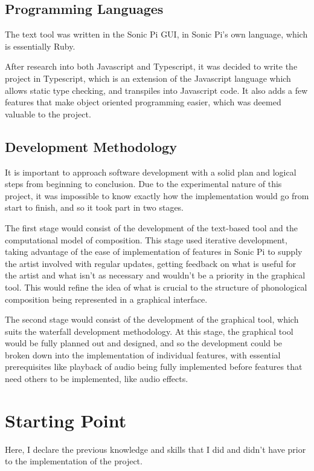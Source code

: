 \documentclass[12pt,a4paper,twoside,openright]{report}
\begin{document}
\subsection{Programming Languages}
The text tool was written in the Sonic Pi GUI, in Sonic Pi's own language, which is essentially Ruby.

After research into both Javascript and Typescript, it was decided to write the project in Typescript, which is an extension of the Javascript language which allows static type checking, and transpiles into Javascript code. It also adds a few features that make object oriented programming easier, which was deemed valuable to the project.

\subsection{Development Methodology}
It is important to approach software development with a solid plan and logical steps from beginning to conclusion. Due to the experimental nature of this project, it was impossible to know exactly how the implementation would go from start to finish, and so it took part in two stages. 

The first stage would consist of the development of the text-based tool and the computational model of composition. This stage used iterative development, taking advantage of the ease of implementation of features in Sonic Pi to supply the artist involved with regular updates, getting feedback on what is useful for the artist and what isn't as necessary and wouldn't be a priority in the graphical tool. This would refine the idea of what is crucial to the structure of phonological composition being represented in a graphical interface.

The second stage would consist of the development of the graphical tool, which suits the waterfall development methodology. At this stage, the graphical tool would be fully planned out and designed, and so the development could be broken down into the implementation of individual features, with essential prerequisites like playback of audio being fully implemented before features that need others to be implemented, like audio effects.

\section{Starting Point}
Here, I declare the previous knowledge and skills that I did and didn't have prior to the implementation of the project.
\end{document}
